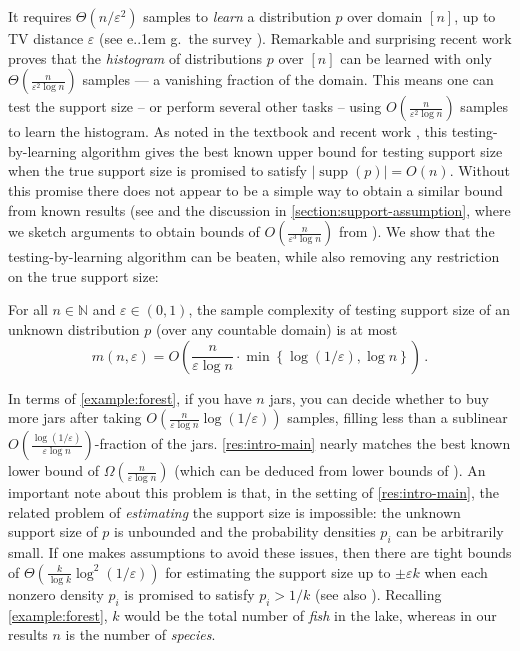 \documentclass{theoretics}
\newcommand*\eg{e.\kern.1em g.\ }
\DeclareMathOperator{\supp}{supp}   %
\newcommand{\bN}{\ensuremath{\mathbb{N}}}
\renewcommand{\epsilon}{\varepsilon}
\begin{document}
It requires $\Theta(n/\epsilon^2)$ samples to \emph{learn} a distribution $p$ over domain $[n]$, up
to TV distance $\epsilon$ (see \eg the survey \cite{Can20}). Remarkable and surprising recent work
\cite{VV11stoc,VV17,HJW18,HO19pml} proves that the \emph{histogram} of distributions $p$ over $[n]$
can be learned with only $\Theta(\tfrac{n}{\epsilon^2 \log n})$ samples --- a vanishing fraction of
the domain. This means one can test the support size -- or perform several other tasks -- using
$O(\tfrac{n}{\epsilon^2 \log n})$ samples to learn the histogram.  As noted in the textbook
\cite{Gol17} and recent work \cite{GR23,AFL24}, this testing-by-learning algorithm gives the best
known upper bound for testing support size when the true support size is promised to satisfy
$|\supp(p)| = O(n)$. Without this promise there does not appear to be a simple way to obtain a
similar bound from known results (see \cite[pp.21]{GR23} and the discussion in
\cref{section:support-assumption}, where we sketch arguments to obtain bounds of
$O(\tfrac{n}{\epsilon^3 \log n})$ from \cite{VV16}). We show that the testing-by-learning algorithm
can be beaten, while also removing any restriction on the true support size:
\begin{theorem}
\label{res:intro-main}
For all $n \in \bN$ and $\epsilon \in (0,1)$, the sample complexity of testing support size of an
unknown distribution $p$ (over any countable domain) is at most
\[
  m(n,\epsilon) = O\left(\frac{n}{\epsilon \log n} \cdot \min\left\{ \log(1/\epsilon), \log n \right\} \right) \,.
\]
\end{theorem}
In terms of \cref{example:forest}, if you have $n$ jars, you can decide whether to buy more jars
after taking $O(\tfrac{n}{\epsilon \log n}\log(1/\epsilon))$ samples, filling
less than a sublinear $O(\tfrac{\log(1/\epsilon)}{\epsilon \log n})$-fraction of the jars.
\cref{res:intro-main} nearly matches the best known lower bound of $\Omega(\tfrac{n}{\epsilon \log
n})$ (which can be deduced from lower bounds of \cite{VV11stoc,WY19}). An important note about this
problem is that, in the setting of \cref{res:intro-main}, the related problem of \emph{estimating}
the support size is impossible: the unknown support size of $p$ is unbounded and the probability
densities $p_i$ can be arbitrarily small. If one makes assumptions to avoid these issues, then there
are tight bounds of $\Theta(\tfrac{k}{\log k} \log^2(1/\epsilon))$ for estimating the support size
up to $\pm \epsilon k$ when each nonzero density $p_i$ is promised to satisfy $p_i > 1/k$
\cite{WY19,HO19} (see also \cite{RRSS09,VV11stoc,ADOS17,VV17}). Recalling \cref{example:forest}, $k$
would be the total number of \emph{fish} in the lake, whereas in our results $n$ is the number of
\emph{species}.
\end{document}
